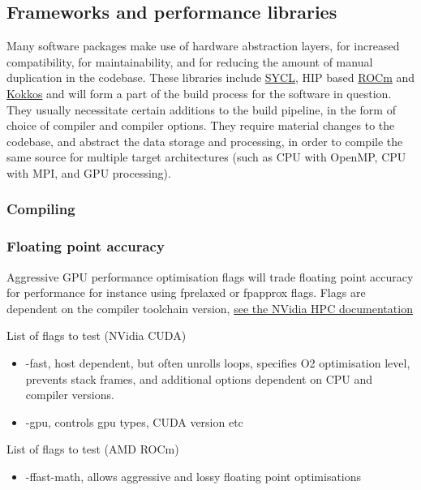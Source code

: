 \subsection{Frameworks and performance libraries}
Many software packages make use of hardware abstraction layers, for increased compatibility, for maintainability, and for reducing the amount of manual duplication in the codebase. These libraries include \href{https://www.khronos.org/sycl/}{SYCL}, HIP based \href{https://rocm.docs.amd.com/en/docs-6.0.2/reference/rocmcc.html}{ROCm} and \href{https://kokkos.org/kokkos-core-wiki/}{Kokkos} and will form a part of the build process for the software in question. They usually necessitate certain additions to the build pipeline, in the form of choice of compiler and compiler options. They require material changes to the codebase, and abstract the data storage and processing, in order to compile the same source for multiple target architectures (such as CPU with OpenMP, CPU with MPI, and GPU processing).


\subsubsection{Compiling}
\subsubsection{Floating point accuracy}
Aggressive GPU performance optimisation flags will trade floating point accuracy for performance for instance using fprelaxed or fpapprox flags. Flags are dependent on the compiler toolchain version, \href{https://docs.nvidia.com/dccpu/grace-perf-tuning-guide/compilers.html}{see the NVidia HPC documentation}





List of flags to test (NVidia CUDA)
\begin{itemize}
	\item{-fast, host dependent, but often unrolls loops, specifies O2 optimisation level, prevents stack frames, and additional options dependent on CPU and compiler versions. }
	\item{-gpu, controls gpu types, CUDA version etc}
\end{itemize}

List of flags to test (AMD ROCm)
\begin{itemize}
	\item{-ffast-math, allows aggressive and lossy floating point optimisations} 
\end{itemize}



